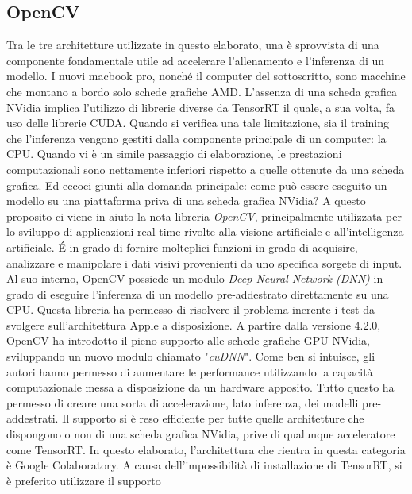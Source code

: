 \subsection{OpenCV}
Tra le tre architetture utilizzate in questo elaborato, una è sprovvista di una 
componente fondamentale utile ad accelerare l'allenamento e l'inferenza di 
un modello. I nuovi macbook pro, nonché il computer del sottoscritto, sono 
macchine che montano a bordo solo schede grafiche AMD. L'assenza di una 
scheda grafica NVidia implica l'utilizzo di librerie diverse da TensorRT il 
quale, a sua volta, fa uso delle librerie CUDA. Quando si verifica una tale 
limitazione, sia il training che l'inferenza vengono gestiti dalla componente 
principale di un computer: la CPU. Quando vi è un simile passaggio di 
elaborazione, le prestazioni computazionali sono nettamente inferiori rispetto 
a quelle ottenute da una scheda grafica. Ed eccoci giunti alla domanda 
principale: come può essere eseguito un modello su una piattaforma priva 
di una scheda grafica NVidia? A questo proposito ci viene in aiuto la nota 
libreria \emph{OpenCV}, principalmente utilizzata per lo sviluppo di applicazioni 
real-time rivolte alla visione artificiale e all'intelligenza artificiale. É in 
grado di fornire molteplici funzioni in grado di acquisire, analizzare e manipolare 
i dati visivi provenienti da uno specifica sorgete di input. Al suo 
interno, OpenCV possiede un modulo \emph{Deep Neural Network (DNN)} in grado 
di eseguire l'inferenza di un modello pre-addestrato direttamente su una 
CPU. Questa libreria ha permesso di risolvere il problema inerente i test 
da svolgere sull'architettura Apple a disposizione. A partire dalla versione 
4.2.0, OpenCV ha introdotto il pieno supporto alle schede grafiche GPU 
NVidia, sviluppando un nuovo modulo chiamato "\emph{cuDNN}". Come ben si 
intuisce, gli autori hanno permesso di aumentare le performance utilizzando 
la capacità computazionale messa a disposizione da un hardware apposito. 
Tutto questo ha permesso di creare una sorta di accelerazione, lato inferenza, 
dei modelli pre-addestrati. Il supporto si è reso efficiente per tutte quelle 
architetture che dispongono o non di una scheda grafica NVidia, prive di 
qualunque acceleratore come TensorRT. In questo elaborato, l'architettura 
che rientra in questa categoria è Google Colaboratory. A causa dell'impossibilità 
di installazione di TensorRT, si è preferito utilizzare il supporto 
